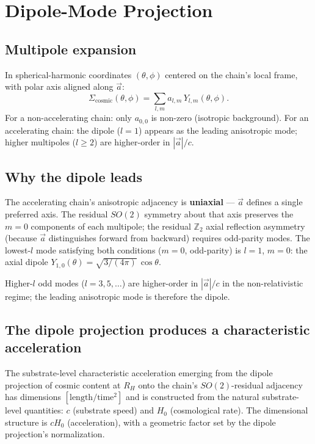 \documentclass[11pt,a4paper]{article}
\begin{document}
\section{Dipole-Mode Projection}

\subsection{Multipole expansion}

In spherical-harmonic coordinates $(\theta, \phi)$ centered on the chain's local frame, with polar axis aligned along $\vec{a}$:
\[
\Sigma_\mathrm{cosmic}(\theta, \phi) = \sum_{l, m} a_{l,m}\,Y_{l,m}(\theta, \phi).
\]
For a non-accelerating chain: only $a_{0,0}$ is non-zero (isotropic background). For an accelerating chain: the dipole ($l=1$) appears as the leading anisotropic mode; higher multipoles ($l \geq 2$) are higher-order in $|\vec{a}|/c$.

\subsection{Why the dipole leads}

The accelerating chain's anisotropic adjacency is \textbf{uniaxial} --- $\vec{a}$ defines a single preferred axis. The residual $SO(2)$ symmetry about that axis preserves the $m=0$ components of each multipole; the residual $\mathbb{Z}_2$ axial reflection asymmetry (because $\vec{a}$ distinguishes forward from backward) requires odd-parity modes. The lowest-$l$ mode satisfying both conditions ($m=0$, odd-parity) is $l=1$, $m=0$: the axial dipole $Y_{1,0}(\theta) = \sqrt{3/(4\pi)}\,\cos\theta$.

Higher-$l$ odd modes ($l=3,5,\ldots$) are higher-order in $|\vec{a}|/c$ in the non-relativistic regime; the leading anisotropic mode is therefore the dipole.

\subsection{The dipole projection produces a characteristic acceleration}

The substrate-level characteristic acceleration emerging from the dipole projection of cosmic content at $R_H$ onto the chain's $SO(2)$-residual adjacency has dimensions $[\text{length}/\text{time}^2]$ and is constructed from the natural substrate-level quantities: $c$ (substrate speed) and $H_0$ (cosmological rate). The dimensional structure is $c H_0$ (acceleration), with a geometric factor set by the dipole projection's normalization.
\end{document}
